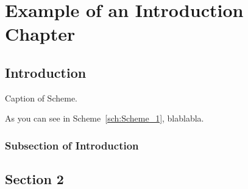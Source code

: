\documentclass[main_brownies.tex]{subfiles}
\begin{document}
\graphicspath{ {Figures_Schemes/} } %

\checkoddpage
\ifoddpage
	\newpage\thispagestyle{empty}
	\mbox{}
	\newpage
	
\else
	
\fi



\chapter[Example Introduction Chapter]{Example of an Introduction Chapter} %

\begin{abstract}
	\Blindtext[1][3]
\end{abstract}



\section{Introduction} \label{section_1_introduction}
\Blindtext[1][1]

\begin{scheme}[htb]
	\centering
	\caption{Caption of Scheme.}
	\label{sch:Scheme_1}
\end{scheme}

\FloatBarrier %

As you can see in Scheme~\ref{sch:Scheme_1}, blablabla.

\subsection{Subsection of Introduction} \label{section_1_1}
\Blindtext[1][1]

\section{Section 2}  \label{section_2}
\end{document}
